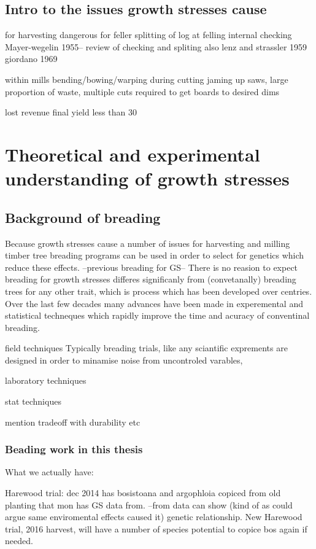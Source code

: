 \documentclass{article}
\begin{document}
\subsection{Intro to the issues growth stresses cause }

for harvesting
dangerous for feller
splitting of log at felling
internal checking
Mayer-wegelin 1955-- review of checking and spliting also lenz and strassler
1959 giordano 1969

within mills
bending/bowing/warping during cutting jaming up saws, large proportion of waste,
multiple cuts required to get boards to desired dims

lost revenue final yield less than 30%


\section{Theoretical and experimental understanding of growth stresses}

\subsection{Background of breading}
Because growth stresses cause a number of issues for harvesting and milling
timber tree breading programs can be used in order to select for genetics which
reduce these effects. --previous breading for GS-- There is no reasion to
expect  breading for growth stresses differes significanly from (convetanally)
breading trees for any other trait, which is process which has been developed
over centries. Over the last few decades many advances have been made in
experemental and statistical techneques which rapidly improve the time and
acuracy of conventinal breading.

 field techniques
Typically breading trials, like any sciantific exprements are designed in order
to minamise noise from uncontroled varables,

laboratory techniques


stat techniques

mention tradeoff with durability etc

\subsubsection{Beading work in this thesis}
What we actually have:

Harewood trial:
dec 2014 has bosistoana and argophloia copiced from old planting that mon has GS
data from. --from data can show (kind of as could argue same enviromental
effects caused it) genetic relationship.
New Harewood trial, 2016 harvest, will
have a number of species potential to copice bos again if needed.
\end{document}
